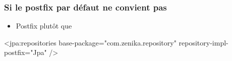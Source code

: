 \begin{frame}[fragile]
 \frametitle{Si le postfix par défaut ne convient pas}
 \begin{itemize}
  \item Postfix  plutôt que 
 \end{itemize}
 \begin{xmlcode}
<jpa:repositories base-package="com.zenika.repository" 
                  repository-impl-postfix="Jpa" /> 
 \end{xmlcode}
\end{frame}

